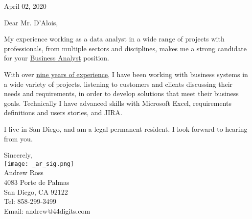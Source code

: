 \documentclass[letterpaper]{article}
\newcommand{\CVjobTitle}{Business Analyst}
\newcommand{\impt}[1]{\uline{#1}}
\begin{document}
\large

\null\hfill April 02, 2020
\vspace{1em}

Dear Mr. D'Alois,

My experience working as a data analyst in a wide range of
projects with professionals, from multiple sectors and disciplines, makes me a
strong candidate for your \impt{\CVjobTitle} position.

With over \impt{nine years of experience}, I have been working with business
systems in a wide variety of projects, listening to customers and clients
discussing their needs and requirements, in order to develop solutions that
meet their business goals.
Technically I have advanced skills with Microsoft Excel, requirements
definitions and users stories, and JIRA.

I live in San Diego, and am a legal permanent resident.  
I look forward to hearing from you.  



Sincerely,\\
\hspace{1em} \texttt{[image: \_ar\_sig.png]} \\
Andrew Ross \\
\small
4083 Porte de Palmas \\
San Diego, CA  92122 \\
Tel: 858-299-3499 \\
Email: andrew@44digits.com
\end{document}
